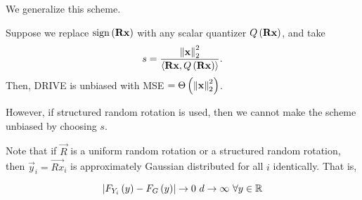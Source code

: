 \documentclass[twoside]{article}
\begin{document}
We generalize this scheme.

\begin{claim}
    Suppose we replace \(\mathrm{sign}\left(\boldsymbol{\mathbf{Rx}}\right)\) with any scalar quantizer
    \(Q\left(\boldsymbol{\mathbf{Rx}}\right)\), and take
    \begin{equation}
        s = \frac{\left\lVert\boldsymbol{\mathbf{x}}\right\rVert_2^2}{\langle\boldsymbol{\mathbf{Rx}},Q\left(\boldsymbol{\mathbf{Rx}}\right)\rangle}.
        \label{eq:sq-def}
    \end{equation}
    Then, DRIVE is unbiased with MSE \( = \Theta\left(\left\lVert\boldsymbol{\mathbf{x}}\right\rVert_2^2\right)\).
\end{claim}

However, if structured random rotation is used, then we cannot make the scheme
unbiased by choosing \(s\).

Note that if \(\vec{R}\) is a uniform random rotation or a structured random
rotation, then \(\vec{y}_i = \vec{Rx}_i\) is approximately Gaussian distributed
for all \(i\) identically. That is,

\begin{equation}
    \abs{F_{Y_i}\brak{y}-F_G\brak{y}} \to 0\ d \to \infty\ \forall y \in \bR
\end{equation}
\end{document}
